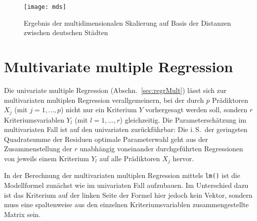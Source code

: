 \begin{figure}[ht]
\centering
\texttt{[image: mds]}
\vspace*{-1em}
\caption{Ergebnis der multidimensionalen Skalierung auf Basis der Distanzen zwischen deutschen Städten}
\label{fig:mds}
\end{figure}

\section{Multivariate multiple Regression}
\label{sec:multRegrMult}

Die univariate multiple Regression (Abschn.\ \ref{sec:regrMult}) lässt sich zur multivariaten multiplen Regression verallgemeinern, bei der durch $p$ Prädiktoren $X_{j}$ (mit $j = 1, \ldots, p$) nicht nur ein Kriterium $Y$ vorhergesagt werden soll, sondern $r$ Kriteriumsvariablen $Y_{l}$ (mit $l = 1, \ldots, r$) gleichzeitig. Die Parameterschätzung im multivariaten Fall ist auf den univariaten zurückführbar: Die i.\,S.\ der geringsten Quadratsumme der Residuen optimale Parameterwahl geht aus der Zusammenstellung der $r$ unabhängig voneinander durchgeführten Regressionen von jeweils einem Kriterium $Y_{l}$ auf alle Prädiktoren $X_{j}$ hervor.

In der Berechnung der multivariaten multiplen Regression mittels \lstinline!lm()! ist die Modellformel zunächst wie im univariaten Fall aufzubauen. Im Unterschied dazu ist das Kriterium auf der linken Seite der Formel hier jedoch kein Vektor, sondern muss eine spaltenweise aus den einzelnen Kriteriumsvariablen zusammengestellte Matrix sein.

